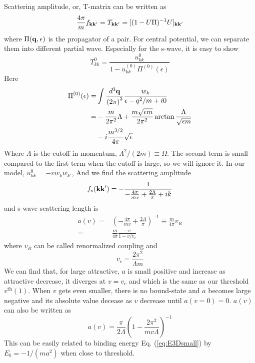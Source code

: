 \documentclass[aps,prb,showpacs,reprint]{revtex4-1}
\begin{document}
Scattering amplitude, or, T-matrix can be written as 
\begin{equation}
\frac{4\pi}{m}f_{\mathbf{k}\mathbf{k}'}=T_{\mathbf{k}\mathbf{k}'}=[(1-U\Pi)^{-1}U]_{\mathbf{k}\mathbf{k}'}
\end{equation}
where $\Pi(\mathbf{q},\epsilon)$ is the propagator of a pair.  For central potential, we can separate them into different partial wave. Especially for the s-wave, it is easy to show 
\begin{equation}
T^{0}_{kk}=\frac{u^{0}_{kk}}{1-u^{(0)}_{kk}\Pi^{(0)}(\epsilon)}
\end{equation}
Here 
\begin{equation}
\begin{split}
\Pi^{(0)}(\epsilon)=&\int\frac{d^{3}\mathbf{q}}{{(2\pi)}^{3}}\frac{w_{k}}{\epsilon-q^{2}/m+i0}\\
=&-\frac{m}{2\pi^{2}}{\Lambda}+\frac{m\sqrt{\epsilon{m}}}{2\pi^{2}}\arctan\frac{\Lambda}{\sqrt{\epsilon{m}}}\\
&-i\frac{m^{3/2}}{4\pi}\sqrt{\epsilon}
\end{split}
\end{equation}
Where $\Lambda$ is the cutoff in momentum, $\Lambda^{2}/(2m)\equiv\Omega$. The second term is small compared to the first term when the cutoff is large, so we will ignore it.  In our model, $u^{0}_{kk}=-vw_{k}w_{k'}$, And we find the scattering amplitude 
\begin{equation}
f_{s}(\mathbf{k}\mathbf{k}')=-\frac{1}{-\frac{4\pi}{mv}+\frac{2\Lambda}{\pi}+ik}
\end{equation}
and s-wave scattering length is 
\begin{equation}
\begin{split}
a(v)=&\left(-\frac{4\pi}{mv}+\frac{2\Lambda}{\pi}\right)^{-1}\equiv\frac{m}{4\pi}v_{R}\\
     =&\frac{m}{4\pi}\frac{-v}{1-v/v_{c}}
     \end{split}
\end{equation}
where $v_{R}$ can be called renormalized coupling and 
\begin{equation}
v_{c}=\frac{2\pi^{2}}{\Lambda{m}}
\end{equation}
We can find that, for large attractive, $a$ is small positive and increase as attractive decrease, it diverges at $v=v_{c}$ and which is the same as our threshold $v^{\text{th}}(1)$.  When $v$ gets even smaller, there is no bound-state and $a$ becomes large negative and its absolute value decease as $v$ decrease until $a(v=0)=0$. 
$a(v)$ can also be written as
\begin{equation}
a(v)=\frac{\pi}{2\Lambda}\left(1-\frac{2\pi^{2}}{mv\Lambda}\right)^{-1}
\end{equation}
This can be easily related to binding energy Eq. (\ref{eq:E3Dsmall}) by $E_{b}=-1/(ma^{2})$ when close to threshold. 
%
%

\end{document}

